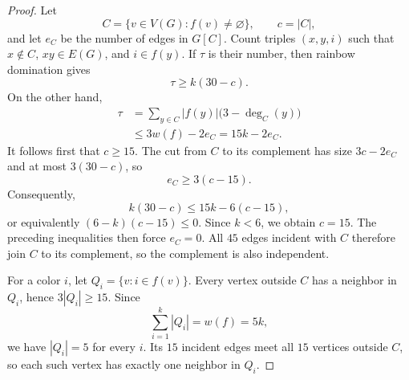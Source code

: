 \documentclass[11pt]{amsart}
\begin{document}
\begin{proof}
Let
\[
  C=\{v\in V(G):f(v)\neq\varnothing\},\qquad c=|C|,
\]
and let $e_C$ be the number of edges in $G[C]$. Count triples
$(x,y,i)$ such that $x\notin C$, $xy\in E(G)$, and $i\in f(y)$. If
$\tau$ is their number, then rainbow domination gives
\[
  \tau\geq k(30-c).
\]
On the other hand,
\[
\begin{aligned}
  \tau
  &=\sum_{y\in C}|f(y)|\bigl(3-\deg_C(y)\bigr)\\
  &\leq 3w(f)-2e_C
   =15k-2e_C.
\end{aligned}
\]
It follows first that $c\geq15$. The cut from $C$ to its complement
has size $3c-2e_C$ and at most $3(30-c)$, so
\[
  e_C\geq3(c-15).
\]
Consequently,
\[
  k(30-c)\leq15k-6(c-15),
\]
or equivalently $(6-k)(c-15)\leq0$. Since $k<6$, we obtain $c=15$.
The preceding inequalities then force $e_C=0$. All $45$ edges incident
with $C$ therefore join $C$ to its complement, so the complement is
also independent.

For a color $i$, let $Q_i=\{v:i\in f(v)\}$. Every vertex outside $C$
has a neighbor in $Q_i$, hence $3|Q_i|\geq15$. Since
\[
  \sum_{i=1}^k |Q_i|=w(f)=5k,
\]
we have $|Q_i|=5$ for every $i$. Its $15$ incident edges meet all $15$
vertices outside $C$, so each such vertex has exactly one neighbor in
$Q_i$.
\end{proof}
\end{document}
